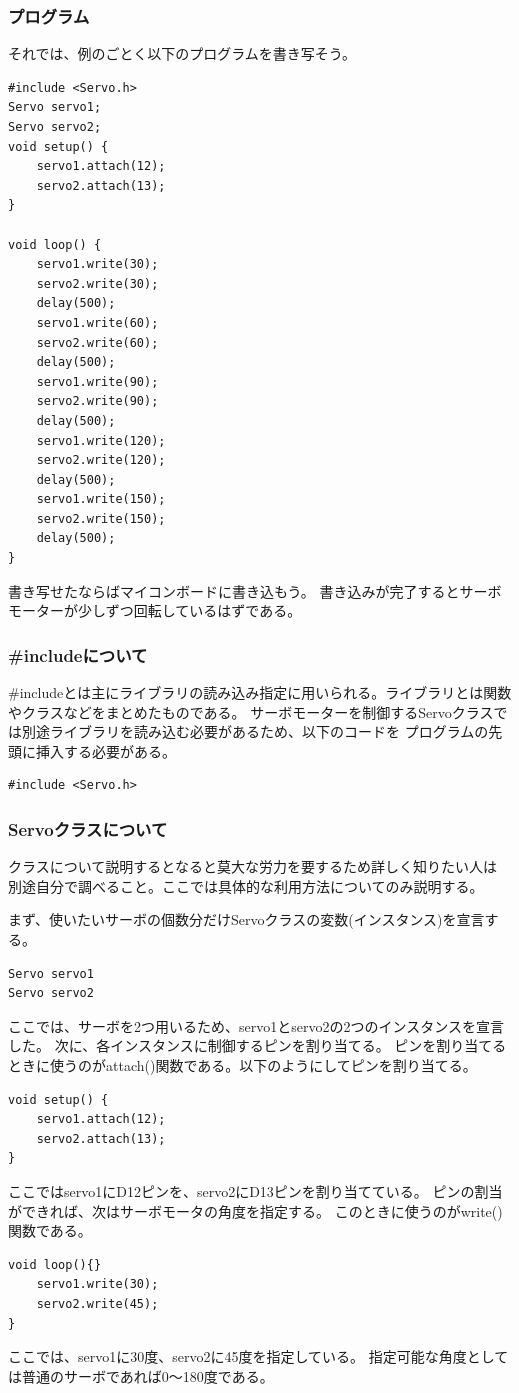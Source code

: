 \documentclass[uplatex]{jsarticle}
\begin{document}
\subsubsection{プログラム}
それでは、例のごとく以下のプログラムを書き写そう。
\begin{lstlisting}[basicstyle=\ttfamily\footnotesize, frame=single]
#include <Servo.h>
Servo servo1;
Servo servo2;
void setup() {
    servo1.attach(12);
    servo2.attach(13);
}
    
void loop() {
    servo1.write(30);
    servo2.write(30);
    delay(500);
    servo1.write(60);
    servo2.write(60);
    delay(500);
    servo1.write(90);
    servo2.write(90);
    delay(500);
    servo1.write(120);
    servo2.write(120);
    delay(500);
    servo1.write(150);
    servo2.write(150);
    delay(500);   
}
\end{lstlisting}
書き写せたならばマイコンボードに書き込もう。
書き込みが完了するとサーボモーターが少しずつ回転しているはずである。
\subsubsection{\#includeについて}
\#includeとは主にライブラリの読み込み指定に用いられる。ライブラリとは関数やクラスなどをまとめたものである。
サーボモーターを制御するServoクラスでは別途ライブラリを読み込む必要があるため、以下のコードを
プログラムの先頭に挿入する必要がある。
\begin{lstlisting}[basicstyle=\ttfamily\footnotesize, frame=single]
#include <Servo.h>
\end{lstlisting}
\subsubsection{Servoクラスについて}
クラスについて説明するとなると莫大な労力を要するため詳しく知りたい人は
別途自分で調べること。ここでは具体的な利用方法についてのみ説明する。

まず、使いたいサーボの個数分だけServoクラスの変数(インスタンス)を宣言する。
\begin{lstlisting}[basicstyle=\ttfamily\footnotesize, frame=single]
Servo servo1
Servo servo2
\end{lstlisting}
ここでは、サーボを2つ用いるため、servo1とservo2の2つのインスタンスを宣言した。
次に、各インスタンスに制御するピンを割り当てる。
ピンを割り当てるときに使うのがattach()関数である。以下のようにしてピンを割り当てる。
\begin{lstlisting}[basicstyle=\ttfamily\footnotesize, frame=single]
void setup() {
    servo1.attach(12);
    servo2.attach(13);
}
\end{lstlisting}
ここではservo1にD12ピンを、servo2にD13ピンを割り当てている。
ピンの割当ができれば、次はサーボモータの角度を指定する。
このときに使うのがwrite()関数である。
\begin{lstlisting}[basicstyle=\ttfamily\footnotesize, frame=single]
void loop(){}
    servo1.write(30);
    servo2.write(45);
}
\end{lstlisting}
ここでは、servo1に30度、servo2に45度を指定している。
指定可能な角度としては普通のサーボであれば0〜180度である。
\end{document}
